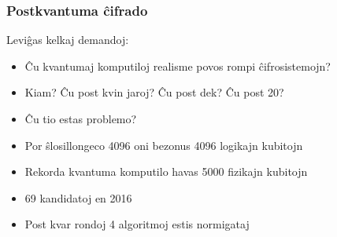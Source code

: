 \documentclass[utf8]{scrartcl}
\begin{document}
\begin{frame}
  \frametitle{Postkvantuma ĉifrado}
  Leviĝas kelkaj demandoj:
  \begin{itemize}
  \item<+-> Ĉu kvantumaj komputiloj realisme povos rompi ĉifrosistemojn?
  \item<+-> Kiam? Ĉu post kvin jaroj? Ĉu post dek? Ĉu post 20?
  \item<+-> Ĉu tio estas problemo?
  \item<+-> Por ŝlosillongeco 4096 oni bezonus 4096 logikajn kubitojn
  \item<+-> Rekorda kvantuma komputilo havas 5000 fizikajn kubitojn
  \end{itemize}

  \vspace{1em}

  \begin{itemize}
  \item<+-> 69 kandidatoj en 2016
  \item<+-> Post kvar rondoj 4 algoritmoj estis normigataj
  \end{itemize}

\end{frame}
\end{document}
